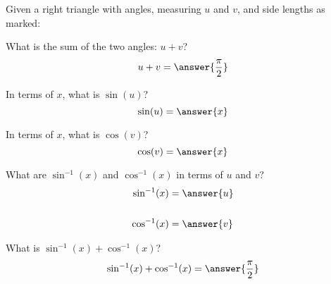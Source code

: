 \documentclass{ximera}
\author{Bobby Ramsey}
\begin{document}
Given a right triangle with angles, measuring $u$ and $v$, and side lengths as marked:
\begin{image}[2in]
\end{image}

\begin{exercise}
	What is the sum of the two angles: $u + v$?
	\[ u + v = \answer{\frac{\pi}{2}} \]
	\begin{exercise}
		In terms of $x$, what is $\sin(u)$?
		\[ \sin(u) = \answer{x} \]
		\begin{exercise}
			In terms of $x$, what is $\cos(v)$?
			\[ \cos(v) = \answer{x} \]
			\begin{exercise}
				What are $\sin^{-1}(x)$ and $\cos^{-1}(x)$ in terms of $u$ and $v$?
				\begin{align*}
					\sin^{-1}(x) &= \answer{u} \\ \\
					\cos^{-1}(x) &= \answer{v}
				\end{align*}
				\begin{exercise}
					What is $\sin^{-1}(x) + \cos^{-1}(x)$?
					\[  \sin^{-1}(x) + \cos^{-1}(x) = \answer{\frac{\pi}{2}} \]
				\end{exercise}
			\end{exercise}
		\end{exercise}
	\end{exercise}
\end{exercise}
\end{document}
